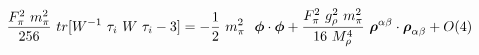 \begin{equation}
\frac{F_\pi^2~ m_\pi^2}{256}~tr[W^{-1}~\tau_i~W~\tau_i -3]= -\frac{1}{2}~m_\pi^2~  ~\mbox{\boldmath$\phi$} \cdot \mbox{\boldmath$\phi$} +\frac{F_\pi^2~ g_\rho^2~ m_\pi^2}{16~M_\rho^4}~\mbox{\boldmath$\rho$}^{\alpha\beta} \cdot  \mbox{\boldmath$\rho$}_{\alpha\beta} + O(4)
\end{equation}

